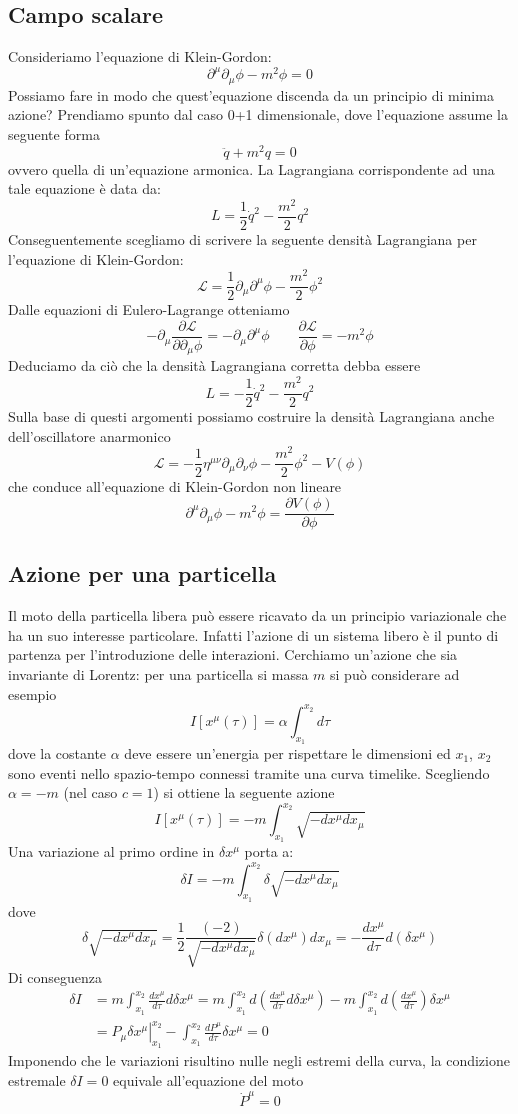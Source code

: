 \documentclass[a4paper,11pt]{book}
\theoremstyle{plain}
\theoremstyle{definition}
\begin{document}
\subsection{Campo scalare}
Consideriamo l'equazione di Klein-Gordon:
\[
\partial^{\mu}\partial_{\mu}\phi-m^2\phi=0
\]
Possiamo fare in modo che quest'equazione discenda da un principio di minima azione? Prendiamo spunto dal caso 0+1 dimensionale, dove l'equazione assume la seguente forma 
\[
\ddot q+m^2q=0
\]
ovvero quella di un'equazione armonica. La Lagrangiana corrispondente ad una tale equazione è data da:
\[
L = \frac{1}{2}\dot q^2 - \frac{m^2}{2}q^2
\]
Conseguentemente scegliamo di scrivere la seguente densità Lagrangiana per l'equazione di Klein-Gordon:
\[
\mathcal{L} = \frac{1}{2}\partial_{\mu}\partial^{\mu}\phi -\frac{m^2}{2}\phi^2
\]
Dalle equazioni di Eulero-Lagrange otteniamo
\[
- \partial_{\mu} \frac{\partial \mathcal{L}}{\partial \partial_{\mu}\phi} = -\partial_{\mu}\partial^{\mu}\phi \qquad \frac{\partial \mathcal{L}}{\partial \phi}=-m^2\phi
\]
Deduciamo da ciò che la densità Lagrangiana corretta debba essere
\[
L = -\frac{1}{2}\dot q^2 - \frac{m^2}{2}q^2
\]
Sulla base di questi argomenti possiamo costruire la densità Lagrangiana anche dell'oscillatore anarmonico
\[
\mathcal{L}=-\frac{1}{2}\eta^{\mu\nu}\partial_{\mu}\partial_{\nu}\phi-\frac{m^2}{2}\phi^2 -V(\phi)
\]
che conduce all'equazione di Klein-Gordon non lineare
\[
\partial^{\mu}\partial_{\mu}\phi-m^2\phi=\frac{\partial V(\phi)}{\partial\phi}
\]
\subsection{Azione per una particella}
Il moto della particella libera può essere ricavato da un principio variazionale che ha un suo interesse particolare. Infatti l'azione di un sistema libero è il punto di partenza per l'introduzione delle interazioni. Cerchiamo un'azione che sia invariante di Lorentz: per una particella si massa $m$ si può considerare ad esempio
\[
I[x^{\mu}(\tau)] = \alpha \int _{x_1}^{x_2}d\tau
\]
dove la costante $\alpha$ deve essere un'energia per rispettare le dimensioni ed $x_1$, $x_2$ sono eventi nello spazio-tempo connessi tramite una curva timelike. Scegliendo $\alpha=-m$ (nel caso $c=1$) si ottiene la seguente azione
\[
I[x^{\mu}(\tau)] = -m\int_{x_1}^{x_2}\sqrt{-dx^{\mu}dx_{\mu}}
\]
Una variazione al primo ordine in $\delta x^{\mu}$ porta a:
\[
\delta I = -m\int_{x_1}^{x_2}\delta\sqrt{-dx^{\mu}dx_{\mu}}
\]
dove 
\[
\delta\sqrt{-dx^{\mu}dx_{\mu}} = \frac{1}{2}\frac{(-2)}{\sqrt{-dx^{\mu}dx_{\mu}}}\delta( dx^{\mu})dx_{\mu} = -\frac{dx^{\mu}}{d\tau}d(\delta x^{\mu})
\]
Di conseguenza
\begin{align*}
\delta I &= m\int_{x_1}^{x_2}\frac{dx^{\mu}}{d\tau}d \delta x^{\mu} = m\int_{x_1}^{x_2} d\left( \frac{dx^{\mu}}{d\tau}d \delta x^{\mu} \right) - m\int_{x_1}^{x_2} d\left( \frac{dx^{\mu}}{d\tau}\right)\delta x^{\mu} \\
&=\left. P_{\mu}\delta x^{\mu} \right| _{x_1}^{x_2}-\int_{x_1}^{x_2}\frac{dP^{\mu}}{d\tau}\delta x^{\mu} = 0
\end{align*}
Imponendo che le variazioni risultino nulle negli estremi della curva, la condizione estremale $\delta I=0$ equivale all'equazione del moto
\[
\dot P^{\mu}=0
\]
\end{document}
